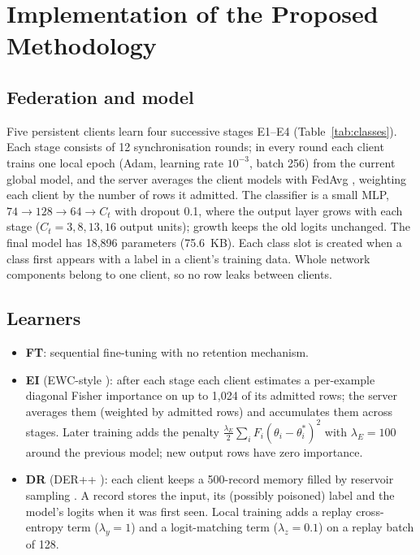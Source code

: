 \documentclass[10pt,a4paper]{article}
\begin{document}
\section{Implementation of the Proposed Methodology}\label{sec:impl}
\subsection{Federation and model}
Five persistent clients learn four successive stages E1--E4 (Table~\ref{tab:classes}). Each stage consists of 12 synchronisation rounds; in every round each client trains one local epoch (Adam, learning rate $10^{-3}$, batch 256) from the current global model, and the server averages the client models with FedAvg \cite{fedavg}, weighting each client by the number of rows it admitted. The classifier is a small MLP, $74\rightarrow128\rightarrow64\rightarrow C_t$ with dropout 0.1, where the output layer grows with each stage ($C_t = 3, 8, 13, 16$ output units); growth keeps the old logits unchanged. The final model has 18,896 parameters (75.6~KB). Each class slot is created when a class first appears with a label in a client's training data. Whole network components belong to one client, so no row leaks between clients.

\subsection{Learners}
\begin{itemize}
\item \textbf{FT}: sequential fine-tuning with no retention mechanism.
\item \textbf{EI} (EWC-style \cite{ewc}): after each stage each client estimates a per-example diagonal Fisher importance on up to 1,024 of its admitted rows; the server averages them (weighted by admitted rows) and accumulates them across stages. Later training adds the penalty $\tfrac{\lambda_E}{2}\sum_i F_i(\theta_i-\theta^\ast_i)^2$ with $\lambda_E=100$ around the previous model; new output rows have zero importance.
\item \textbf{DR} (DER++ \cite{der}): each client keeps a 500-record memory filled by reservoir sampling \cite{vitter}. A record stores the input, its (possibly poisoned) label and the model's logits when it was first seen. Local training adds a replay cross-entropy term ($\lambda_y=1$) and a logit-matching term ($\lambda_z=0.1$) on a replay batch of 128.
\end{itemize}
\end{document}
